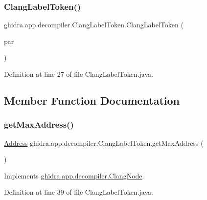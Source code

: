 \subsubsection{\texorpdfstring{ClangLabelToken()}{ClangLabelToken()}}
{\footnotesize\ttfamily ghidra.\+app.\+decompiler.\+Clang\+Label\+Token.\+Clang\+Label\+Token (\begin{DoxyParamCaption}\item[{\mbox{\hyperlink{interfaceghidra_1_1app_1_1decompiler_1_1_clang_node}{Clang\+Node}}}]{par }\end{DoxyParamCaption})\hspace{0.3cm}{\ttfamily [inline]}}



Definition at line 27 of file Clang\+Label\+Token.\+java.



\subsection{Member Function Documentation}
\mbox{\label{classghidra_1_1app_1_1decompiler_1_1_clang_label_token_a95af920ece03bd91e20d1dd7e7012512}} 
\subsubsection{\texorpdfstring{getMaxAddress()}{getMaxAddress()}}
{\footnotesize\ttfamily \mbox{\hyperlink{class_address}{Address}} ghidra.\+app.\+decompiler.\+Clang\+Label\+Token.\+get\+Max\+Address (\begin{DoxyParamCaption}{ }\end{DoxyParamCaption})\hspace{0.3cm}{\ttfamily [inline]}}



Implements \mbox{\hyperlink{interfaceghidra_1_1app_1_1decompiler_1_1_clang_node_a91e8beccce17b875e07d7c0747b43a97}{ghidra.\+app.\+decompiler.\+Clang\+Node}}.



Definition at line 39 of file Clang\+Label\+Token.\+java.

\mbox{\label{classghidra_1_1app_1_1decompiler_1_1_clang_label_token_a077f85f65075e08fbd1a566bd4ada277}} 
